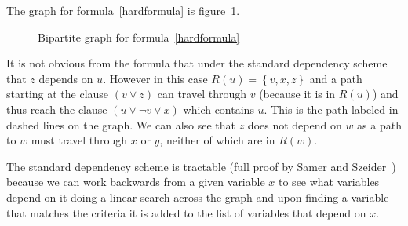The graph for formula~\ref{hardformula} is figure~\ref{bigraphhard}.

\begin{figure}
\begin{CenteredBox}

\end{CenteredBox}
\caption{Bipartite graph for formula~\ref{hardformula}}
\label{bigraphhard}
\end{figure}

It is not obvious from the formula that under the standard dependency scheme that $z$ depends on $u$. However in this case $R(u)=\left \{v, x, z\right \}$ and a path starting at the clause $(v \lor z)$ can travel through $v$ (because it is in $R(u)$) and thus reach the clause $(u \lor \neg v \lor x)$ which contains $u$. This is the path labeled in dashed lines on the graph. We can also see that $z$ does not depend on $w$ as a path to $w$ must travel through $x$ or $y$, neither of which are in $R(w)$.

The standard dependency scheme is tractable (full proof by Samer and Szeider~\cite{backdoorsets}) because we can work backwards from a given variable $x$ to see what variables depend on it doing a linear search across the graph and upon finding a variable that matches the criteria it is added to the list of variables that depend on $x$. 
